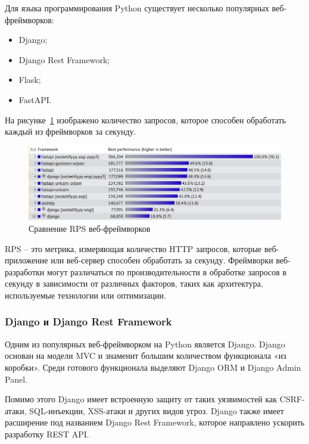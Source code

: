 Для языка программирования Python существует несколько популярных веб-фреймворков:
\begin{itemize}
    \item Django\cite{django_desc};
    \item Django Rest Framework\cite{drf_desc};
    \item Flask;
    \item FastAPI\cite{fastapi_desc}.
\end{itemize}

На рисунке~\ref{fig:domain:frameworks-rps} изображено количество запросов, которое способен обработать каждый из фреймворков за секунду.

\begin{figure}[ht]
    \centering
    \includegraphics[width=.6\linewidth]{images/frameworks_rps}
    \caption{Сравнение RPS веб-фреймворков}
    \label{fig:domain:frameworks-rps}
\end{figure}

RPS -- это метрика, измеряющая количество HTTP запросов, которые веб-приложение или веб-сервер способен обработать за секунду.
Фреймворки веб-разработки могут различаться по производительности в обработке запросов в секунду в зависимости от различных факторов, таких как архитектура, используемые технологии или оптимизации.




\subsubsection{Django и Django Rest Framework}\label{subsubsec:domain:django--django-rest-framework}
Одним из популярных веб-фреймворком на Python является Django.
Django основан на модели MVC и знаменит большим количеством функционала «из коробки».
Среди готового функционала выделяют Django ORM и Django Admin Panel.

Помимо этого Django имеет встроенную защиту от таких уязвимостей как CSRF-атаки, SQL-инъекции, XSS-атаки и других видов угроз.
Django также имеет расширение под названием Django Rest Framework, которое направлено ускорить разработку REST API.


